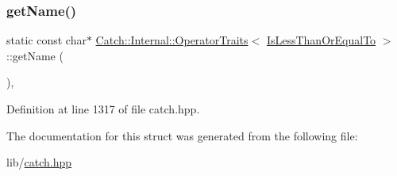 \subsubsection{\texorpdfstring{get\+Name()}{getName()}}
{\footnotesize\ttfamily static const char$\ast$ \hyperlink{struct_catch_1_1_internal_1_1_operator_traits}{Catch\+::\+Internal\+::\+Operator\+Traits}$<$ \hyperlink{namespace_catch_1_1_internal_ae3f96598a7858155750bf38e7295d83ea0db29a4c3f1e81260036c5e27a8407fd}{Is\+Less\+Than\+Or\+Equal\+To} $>$\+::get\+Name (\begin{DoxyParamCaption}{ }\end{DoxyParamCaption})\hspace{0.3cm}{\ttfamily [inline]}, {\ttfamily [static]}}



Definition at line 1317 of file catch.\+hpp.



The documentation for this struct was generated from the following file\+:\begin{DoxyCompactItemize}
\item 
lib/\hyperlink{catch_8hpp}{catch.\+hpp}\end{DoxyCompactItemize}
